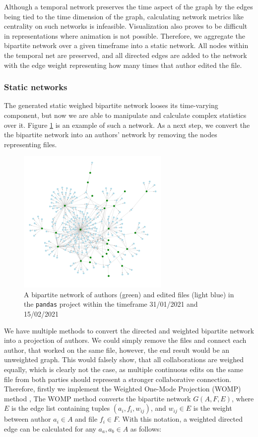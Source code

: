 Although a temporal network preserves the time aspect of the graph by the edges being tied to the time dimension of the graph, calculating network metrics like centrality on such networks is infeasible. Visualization also proves to be difficult in representations where animation is not possible. Therefore, we aggregate the bipartite network over a given timeframe into a static network. All nodes within the temporal net are preserved, and all directed edges are added to the network with the edge weight representing how many times that author edited the file. \\

\subsubsection{Static networks}
The generated static weighed bipartite network looses its time-varying component, but now we are able to manipulate and calculate complex statistics over it. Figure \ref{fig:bipartite} is an example of such a network. As a next step, we convert the the bipartite network into an authors' network by removing the nodes representing files. \\

\begin{figure}
    \centering
    \includegraphics[width=0.65\textwidth]{figures/bipartite.png}
    \caption{A bipartite network of authors (green) and edited files (light blue) in the \texttt{pandas} project within the timeframe 31/01/2021 and 15/02/2021}
    \label{fig:bipartite}
\end{figure}

We have multiple methods to convert the directed and weighted bipartite network into a projection of authors. We could simply remove the files and connect each author, that worked on the same file, however, the end result would be an unweighted graph. This would falsely show, that all collaborations are weighed equally, which is clearly not the case, as multiple continuous edits on the same file from both parties should represent a stronger collaborative connection. Therefore, firstly we implement the Weighted One-Mode Projection (WOMP) method \cite{stramWeightedOneMode2017}, The WOMP method converts the bipartite network $G(A,F,E)$, where $E$ is the edge list containing tuples $(a_i,f_i,w_{ij})$, and $w_{ij} \in E$ is the weight between author $a_i \in A$ and file $f_i \in F$. With this notation, a weighted directed edge can be calculated for any $a_a, a_b \in A$ as follows:


